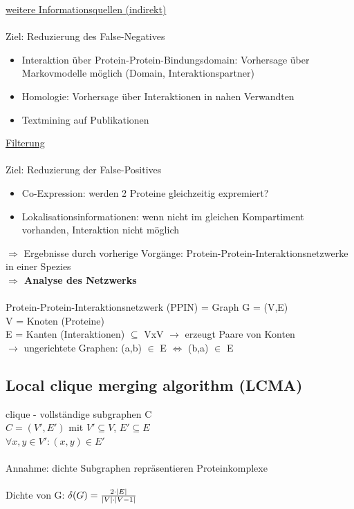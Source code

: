 \underline{weitere Informationsquellen (indirekt)}\\\\
Ziel: Reduzierung des False-Negatives
\begin{itemize}
	\item Interaktion über Protein-Protein-Bindungsdomain: Vorhersage über Markovmodelle möglich (Domain, Interaktionspartner)
	\item Homologie: Vorhersage über Interaktionen in nahen Verwandten
	\item Textmining auf Publikationen
\end{itemize}

\underline{Filterung}\\\\
Ziel: Reduzierung der False-Positives
\begin{itemize}
	\item Co-Expression: werden 2 Proteine gleichzeitig expremiert?
	\item Lokalisationsinformationen: wenn nicht im gleichen Kompartiment vorhanden, Interaktion nicht möglich
\end{itemize}

$\Rightarrow$ Ergebnisse durch vorherige Vorgänge: Protein-Protein-Interaktionsnetzwerke in einer Spezies\\
\textbf{$\Rightarrow$ Analyse des Netzwerks}
\\\\
Protein-Protein-Interaktionsnetzwerk (PPIN) = Graph G = (V,E)\\
V = Knoten (Proteine)\\
E = Kanten (Interaktionen) $\subseteq$ VxV $\rightarrow$ erzeugt Paare von Konten\\
$\rightarrow$ ungerichtete Graphen: (a,b) $\in$ E $\Leftrightarrow$ (b,a) $\in$ E

\subsection{Local clique merging algorithm (LCMA)}
clique - vollständige subgraphen C\\
$C=(V',E')$ mit $V'\subseteq V$, $E'\subseteq E$\\
$\forall x,y \in V': (x,y) \in E'$\\
\\
Annahme: dichte Subgraphen repräsentieren Proteinkomplexe\\\\
Dichte von G: $\delta(G) = {2 \cdot |E| \over |V| \cdot |V-1|}$\\

